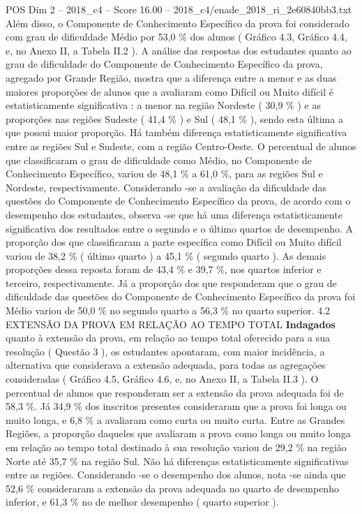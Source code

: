 \begin{textsample}{POS Dim 2 – 2018\_c4 – Score 16.00 – 2018\_c4/enade\_2018\_ri\_2e60840bb3.txt}
Além disso, o Componente de Conhecimento Específico da prova foi considerado com grau de dificuldade Médio por 53,0 \% dos alunos ( Gráfico 4.3, Gráfico 4.4, e, no Anexo II, a Tabela II.2 ).
A análise das respostas dos estudantes quanto ao grau de dificuldade do Componente de Conhecimento Específico da prova, agregado por Grande Região, mostra que a diferença entre a menor e as duas maiores proporções de alunos que a avaliaram como Difícil ou Muito difícil é estatisticamente significativa : a menor na região Nordeste ( 30,9 \% ) e as proporções nas regiões Sudeste ( 41,4 \% ) e Sul ( 48,1 \% ), sendo esta última a que possui maior proporção.
Há também diferença estatisticamente significativa entre as regiões Sul e Sudeste, com a região Centro-Oeste.
O percentual de alunos que classificaram o grau de dificuldade como Médio, no Componente de Conhecimento Específico, variou de 48,1 \% a 61,0 \%, para as regiões Sul e Nordeste, respectivamente.
Considerando -se a avaliação da dificuldade das questões do Componente de Conhecimento Específico da prova, de acordo com o desempenho dos estudantes, observa -se que há uma diferença estatisticamente significativa dos resultados entre o segundo e o último quartos de desempenho.
A proporção dos que classificaram a parte específica como Difícil ou Muito difícil variou de 38,2 \% ( último quarto ) a 45,1 \% ( segundo quarto ).
As demais proporções dessa reposta foram de 43,4 \% e 39,7 \%, nos quartos inferior e terceiro, respectivamente.
Já a proporção dos que responderam que o grau de dificuldade das questões do Componente de Conhecimento Específico da prova foi Médio variou de 50,0 \% no segundo quarto a 56,3 \% no quarto superior. 4.2 EXTENSÃO DA PROVA EM RELAÇÃO AO TEMPO TOTAL \textbf{Indagados} quanto à extensão da prova, em relação ao tempo total oferecido para a sua resolução ( Questão 3 ), os estudantes apontaram, com maior incidência, a alternativa que considerava a extensão adequada, para todas as agregações consideradas ( Gráfico 4.5, Gráfico 4.6, e, no Anexo II, a Tabela II.3 ).
O percentual de alunos que responderam ser a extensão da prova adequada foi de 58,3 \%.
Já 34,9 \% dos inscritos presentes consideraram que a prova foi longa ou muito longa, e 6,8 \% a avaliaram como curta ou muito curta.
Entre as Grandes Regiões, a proporção daqueles que avaliaram a prova como longa ou muito longa em relação ao tempo total destinado à sua resolução variou de 29,2 \% na região Norte até 35,7 \% na região Sul.
Não há diferenças estatisticamente significativas entre as regiões.
Considerando -se o desempenho dos alunos, nota -se ainda que 52,6 \% consideraram a extensão da prova adequada no quarto de desempenho inferior, e 61,3 \% no de melhor desempenho ( quarto superior ).

\end{textsample}
